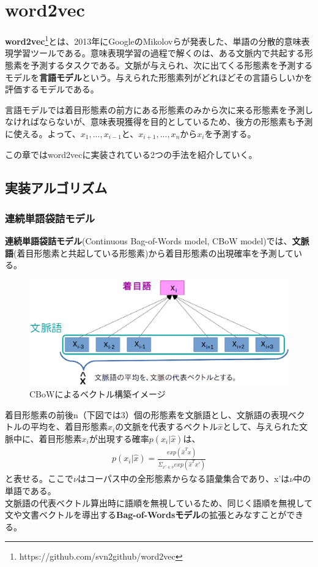 \chapter{word2vec}
\textbf{word2vec}\footnote{https://github.com/svn2github/word2vec}とは、2013年にGoogleのMikolovらが発表した、単語の分散的意味表現学習ツールである。意味表現学習の過程で解くのは、ある文脈内で共起する形態素を予測するタスクである。文脈が与えられ、次に出てくる形態素を予測するモデルを\textbf{言語モデル}という。与えられた形態素列がどれほどその言語らしいかを評価するモデルである。

言語モデルでは着目形態素の前方にある形態素のみから次に来る形態素を予測しなければならないが、意味表現獲得を目的としているため、後方の形態素も予測に使える。よって、$x_1,...,x_{i-1}$と、$x_{i+1},...,x_n$から$x_i$を予測する。

この章ではword2vecに実装されている2つの手法を紹介していく。

\section{実装アルゴリズム}
\subsection{連続単語袋詰モデル}
\textbf{連続単語袋詰モデル}(Continuous Bag-of-Words model, CBoW model)では、\textbf{文脈語}(着目形態素と共起している形態素)から着目形態素の出現確率を予測している。
\begin{figure}[h]
  \centering
  \includegraphics[width=12.5cm]{../images/CBoW.eps}
  \caption{CBoWによるベクトル構築イメージ}
\end{figure}

着目形態素の前後n（下図では3）個の形態素を文脈語とし、文脈語の表現ベクトルの平均を、着目形態素$x_i$の文脈を代表するベクトル$\widehat{x}$として、与えられた文脈中に、着目形態素$x_i$が出現する確率$p(x_i|\widehat{x})$は、
\begin{eqnarray}
  \label{cbow_p}
  p(x_i|\widehat{x}) = \frac{exp(\widehat{x}^Tx)}{\Sigma_{x'\in\nu}exp(\widehat{x}^Tx')}
\end{eqnarray}
と表せる。ここで$\nu$はコーパス中の全形態素からなる語彙集合であり、x'は$\nu$中の単語である。\\
文脈語の代表ベクトル算出時に語順を無視しているため、同じく語順を無視して文や文書ベクトルを導出する\textbf{Bag-of-Wordsモデル}の拡張とみなすことができる。

